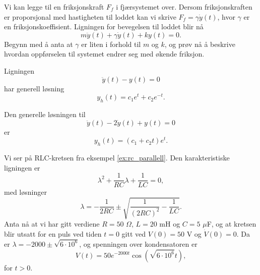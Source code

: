 \documentclass{article}
\theoremstyle{definition}
\newenvironment{ex}
{\pushQED{\qed}\renewcommand{\qedsymbol}{$\triangle$}\exx}
{\popQED\endexx}
\theoremstyle{remark}
\begin{document}
\begin{multicols*}{2}
\begin{ex}
  Vi kan legge til en friksjonskraft $F_f$ i fjærsystemet over. Dersom friksjonskraften er proporsjonal med hastigheten til loddet kan vi skrive $F_f = \gamma \dot{y}(t)$, hvor $\gamma$ er en friksjonskoeffisient. Ligningen for bevegelsen til loddet blir nå
  \begin{equation*}
    m \ddot{y}(t) + \gamma \dot{y}(t) + ky(t) = 0.
  \end{equation*}
  Begynn med å anta at $\gamma$ er liten i forhold til $m$ og $k$, og prøv nå å beskrive hvordan oppførselen til systemet endrer seg med økende friksjon.
\end{ex}

\begin{ex}
  Ligningen
  \begin{equation*}
    \ddot{y}(t) - y(t) = 0
  \end{equation*}
  har generell løsning
  \begin{equation*}
    y_h(t) = c_1 e^{t} + c_2 e^{-t}.
  \end{equation*}
\end{ex}

\begin{ex}
  Den generelle løsningen til
  \begin{equation*}
    \ddot{y}(t) - 2 \dot{y}(t) + y(t) = 0
  \end{equation*}
  er
  \begin{equation*}
    y_h(t) = (c_1 + c_2 t) e^t.
  \end{equation*}
\end{ex}

\begin{ex}
  Vi ser på RLC-kretsen fra eksempel \ref{ex:rc_parallell}. Den karakteristiske ligningen er
  \begin{equation*}
    \lambda^2 + \frac{1}{RC} \lambda + \frac{1}{LC} = 0,
  \end{equation*}
  med løsninger
  \begin{equation*}
    \lambda = - \frac{1}{2 R C} \pm \sqrt{\frac{1}{(2 R C)^2} - \frac{1}{LC}}.
  \end{equation*}
  Anta nå at vi har gitt verdiene $R = 50$ $\Omega$, $L = 20 $ mH og $C = 5$ $\mu$F, og at kretsen blir utsatt for en puls ved tiden $t = 0$ gitt ved $V(0) = 50$ V og $\dot{V}(0) = 0$. Da er $\lambda = -2000 \pm \sqrt{6 \cdot 10^6}$, og spenningen over kondensatoren er
  \begin{equation*}
    V(t) = 50 e^{- 2000 t} \cos(\sqrt{6 \cdot 10^6} t),
  \end{equation*}
  for $t > 0$.
\end{ex}


\end{multicols*}
\end{document}
